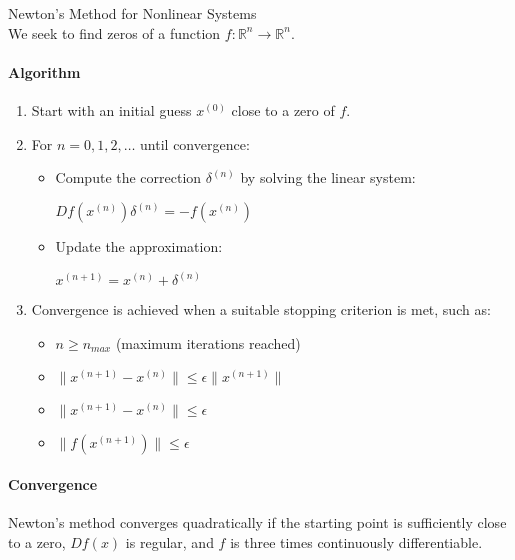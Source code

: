 \begin{KR}{Newton's Method for Nonlinear Systems}\\
We seek to find zeros of a function $f: \mathbb{R}^n \rightarrow \mathbb{R}^n$.

\paragraph{Algorithm}
\begin{enumerate}
    \item Start with an initial guess $x^{(0)}$ close to a zero of $f$.
    \item For $n = 0, 1, 2, \ldots$ until convergence:
    \begin{itemize}
        \item Compute the correction $\delta^{(n)}$ by solving the linear system:
        
        $Df(x^{(n)})\delta^{(n)} = -f(x^{(n)})$
        
        \item Update the approximation:
        
        $x^{(n+1)} = x^{(n)} + \delta^{(n)}$
    \end{itemize}
    \item Convergence is achieved when a suitable stopping criterion is met, such as:
    \begin{itemize}
        \item $n \geq n_{max}$ (maximum iterations reached)
        \item $\|x^{(n+1)} - x^{(n)}\| \leq \epsilon\|x^{(n+1)}\|$ 
        \item $\|x^{(n+1)} - x^{(n)}\| \leq \epsilon$
        \item $\|f(x^{(n+1)})\| \leq \epsilon$
    \end{itemize}
\end{enumerate}

\paragraph{Convergence} 
Newton's method converges quadratically if the starting point is sufficiently close to a zero, $Df(x)$ is regular, and $f$ is three times continuously differentiable.
\end{KR}

